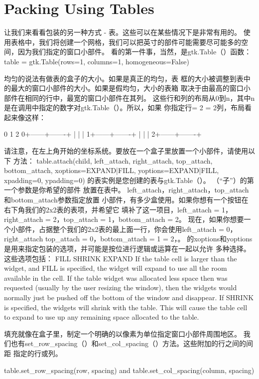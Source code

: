 \section{Packing Using Tables}
让我们来看看包装的另一种方式 - 表。这些可以在某些情况下是非常有用的。
使用表格中，我们将创建一个网格，我们可以把英寸的部件可能需要尽可能多的空间，因为我们指定的窗口小部件。
看的第一件事，当然，是gtk.Table（）函数：
table = gtk.Table(rows=1, columns=1, homogeneous=False)

均匀的说法有做表的盒子的大小。如果是真正的均匀，表
框的大小被调整到表中的最大的窗口小部件的大小。如果是假均匀，大小的表箱
取决于由最高的窗口小部件在相同的行中，最宽的窗口小部件在其列。
这些行和列的布局从0到n，其中n是在调用中指定的数字对gtk.Table（）。所以，如果
你指定行= 2 = 2列，布局看起来像这样：

0	1	2
0+------+-------+
 |	|	|
1+------+-------+
 |	|	|
2+------+-------+


请注意，在左上角开始的坐标系统。要放在一个盒子里放置一个小部件，请使用以下
方法：
table.attach(child, left_attach, right_attach, top_attach, bottom_attach, xoptions=EXPAND|FILL, yoptions=EXPAND|FILL, xpadding=0, ypadding=0)
的表实例是您创建的表与gtk.Table（）。 （“子”）的第一个参数是你希望的部件
放置在表中。
left_attach，right_attach，top_attach和bottom_attach参数指定放置
小部件，有多少盒使用。如果你想有一个按钮在右下角我们的2x2表的表项，并希望它
填补了这一项目，left_attach = 1，right_attach = 2，top_attach = 1，bottom_attach
= 2。
现在，如果你想要一个小部件，占据整个我们的2x2表的最上面一行，你会使用left_attach = 0，
right_attach top_attach = 0，bottom_attach = 1 = 2，。
的xoptions和yoptions是用来指定包装的选项，并可能是按位进行逻辑或运算在一起以允许
多种选择。
这些选项包括：
FILL
SHRINK
EXPAND
If the table cell is larger than the widget, and FILL is specified, the widget will expand to
use all the room available in the cell.
If the table widget was allocated less space then was requested (usually by the user resizing
the window), then the widgets would normally just be pushed off the bottom of the window
and disappear. If SHRINK is specified, the widgets will shrink with the table.
This will cause the table cell to expand to use up any remaining space allocated to the table.


填充就像在盒子里，制定一个明确的以像素为单位指定窗口小部件周围地区。
我们也有set_row_spacing（）和set_col_spacing（）方法。这些附加的行之间的间距
指定的行或列。

table.set_row_spacing(row, spacing)
and
table.set_col_spacing(column, spacing)

